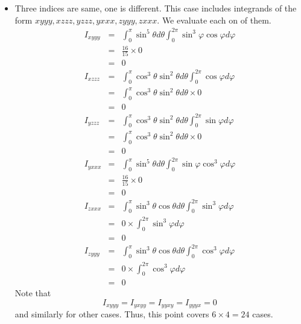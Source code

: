 \begin{itemize}
\item Three indices are same, one is different. This case includes integrands of the form $xyyy, xzzz, yzzz, yxxx, zyyy, zxxx$. We evaluate each on of them.
\begin{eqnarray*}
I_{xyyy} &=& \int_0^\pi\sin^5\theta d\theta \int_0^{2\pi}\sin^3\varphi\cos\varphi d\varphi \\
 &=& \frac{16}{15} \times 0 \\
 &=& 0 \\
I_{xzzz} &=& \int_0^\pi\cos^3\theta\sin^2\theta d\theta \int_0^{2\pi}\cos\varphi d\varphi \\
 &=& \int_0^\pi\cos^3\theta\sin^2\theta d\theta \times 0 \\
 &=& 0 \\
I_{yzzz} &=& \int_0^\pi\cos^3\theta\sin^2\theta d\theta \int_0^{2\pi}\sin\varphi d\varphi \\
 &=& \int_0^\pi\cos^3\theta\sin^2\theta d\theta \times 0 \\
 &=& 0 \\
I_{yxxx} &=& \int_0^\pi\sin^5\theta d\theta \int_0^{2\pi}\sin\varphi\cos^3\varphi d\varphi \\
 &=& \frac{16}{15} \times 0 \\
 &=& 0 \\
I_{zxxx} &=& \int_0^\pi\sin^3\theta \cos\theta d\theta \int_0^{2\pi}\sin^3\varphi d\varphi \\
 &=& 0 \times \int_0^{2\pi}\sin^3\varphi d\varphi \\
 &=& 0\\
I_{zyyy} &=& \int_0^\pi\sin^3\theta \cos\theta d\theta \int_0^{2\pi}\cos^3\varphi d\varphi \\
 &=& 0 \times \int_0^{2\pi}\cos^3\varphi d\varphi \\
 &=& 0
\end{eqnarray*}
Note that 
\[
I_{xyyy} = I_{yxyy} = I_{yyxy} = I_{yyyx} = 0
\]
and similarly for other cases. Thus, this point covers $6 \times 4 = 24$ cases.


\end{itemize}
